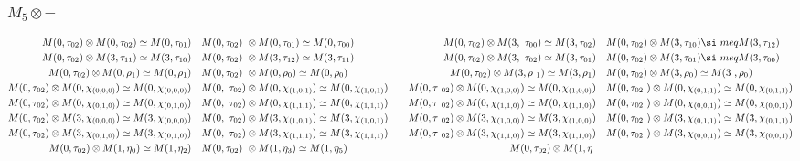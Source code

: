 \subsubsection{$M_5\otimes -$}
\begin{align*}
M(0,\tau_{02}) \otimes M(0,\tau_{02}) \simeq M(0,\tau_{01}) &&& M(0,\tau_{02})\
 \otimes M(0,\tau_{01}) \simeq M(0,\tau_{00}) &&& M(0,\tau_{02}) \otimes M(3,\
\tau_{00}) \simeq M(3,\tau_{02}) &&& M(0,\tau_{02}) \otimes M(3,\tau_{10}) \si\
meq M(3,\tau_{12})\\
M(0,\tau_{02}) \otimes M(3,\tau_{11}) \simeq M(3,\tau_{10}) &&& M(0,\tau_{02})\
 \otimes M(3,\tau_{12}) \simeq M(3,\tau_{11}) &&& M(0,\tau_{02}) \otimes M(3,\
\tau_{02}) \simeq M(3,\tau_{01}) &&& M(0,\tau_{02}) \otimes M(3,\tau_{01}) \si\
meq M(3,\tau_{00})\\
M(0,\tau_{02}) \otimes M(0,\rho_{1}) \simeq M(0,\rho_{1}) &&& M(0,\tau_{02}) \
\otimes M(0,\rho_{0}) \simeq M(0,\rho_{0}) &&& M(0,\tau_{02}) \otimes M(3,\rho\
_{1}) \simeq M(3,\rho_{1}) &&& M(0,\tau_{02}) \otimes M(3,\rho_{0}) \simeq M(3\
,\rho_{0})\\
M(0,\tau_{02}) \otimes M(0,\chi_{(0,0,0)}) \simeq M(0,\chi_{(0,0,0)}) &&& M(0,\
\tau_{02}) \otimes M(0,\chi_{(1,0,1)}) \simeq M(0,\chi_{(1,0,1)}) &&& M(0,\tau\
_{02}) \otimes M(0,\chi_{(1,0,0)}) \simeq M(0,\chi_{(1,0,0)}) &&& M(0,\tau_{02\
}) \otimes M(0,\chi_{(0,1,1)}) \simeq M(0,\chi_{(0,1,1)})\\
M(0,\tau_{02}) \otimes M(0,\chi_{(0,1,0)}) \simeq M(0,\chi_{(0,1,0)}) &&& M(0,\
\tau_{02}) \otimes M(0,\chi_{(1,1,1)}) \simeq M(0,\chi_{(1,1,1)}) &&& M(0,\tau\
_{02}) \otimes M(0,\chi_{(1,1,0)}) \simeq M(0,\chi_{(1,1,0)}) &&& M(0,\tau_{02\
}) \otimes M(0,\chi_{(0,0,1)}) \simeq M(0,\chi_{(0,0,1)})\\
M(0,\tau_{02}) \otimes M(3,\chi_{(0,0,0)}) \simeq M(3,\chi_{(0,0,0)}) &&& M(0,\
\tau_{02}) \otimes M(3,\chi_{(1,0,1)}) \simeq M(3,\chi_{(1,0,1)}) &&& M(0,\tau\
_{02}) \otimes M(3,\chi_{(1,0,0)}) \simeq M(3,\chi_{(1,0,0)}) &&& M(0,\tau_{02\
}) \otimes M(3,\chi_{(0,1,1)}) \simeq M(3,\chi_{(0,1,1)})\\
M(0,\tau_{02}) \otimes M(3,\chi_{(0,1,0)}) \simeq M(3,\chi_{(0,1,0)}) &&& M(0,\
\tau_{02}) \otimes M(3,\chi_{(1,1,1)}) \simeq M(3,\chi_{(1,1,1)}) &&& M(0,\tau\
_{02}) \otimes M(3,\chi_{(1,1,0)}) \simeq M(3,\chi_{(1,1,0)}) &&& M(0,\tau_{02\
}) \otimes M(3,\chi_{(0,0,1)}) \simeq M(3,\chi_{(0,0,1)})\\
M(0,\tau_{02}) \otimes M(1,\eta_{0}) \simeq M(1,\eta_{2}) &&& M(0,\tau_{02}) \
\otimes M(1,\eta_{3}) \simeq M(1,\eta_{5}) &&& M(0,\tau_{02}) \otimes M(1,\eta\

\end{align*}
